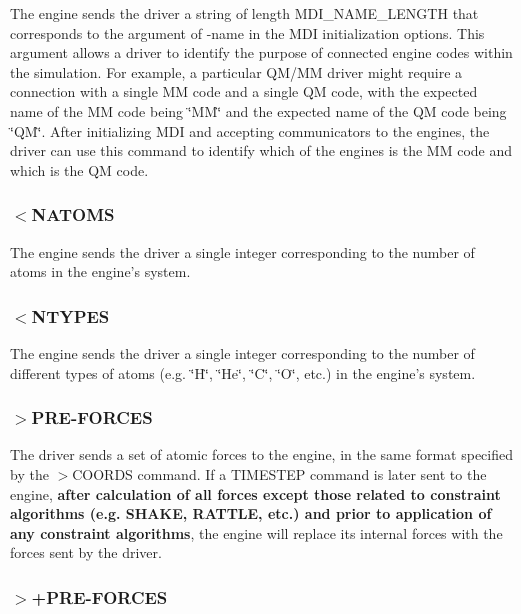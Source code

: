 The engine sends the driver a string of length {\ttfamily M\-D\-I\-\_\-\-N\-A\-M\-E\-\_\-\-L\-E\-N\-G\-T\-H} that corresponds to the argument of {\ttfamily -\/name} in the M\-D\-I initialization options. This argument allows a driver to identify the purpose of connected engine codes within the simulation. For example, a particular Q\-M/\-M\-M driver might require a connection with a single M\-M code and a single Q\-M code, with the expected name of the M\-M code being \char`\"{}\-M\-M\char`\"{} and the expected name of the Q\-M code being \char`\"{}\-Q\-M\char`\"{}. After initializing M\-D\-I and accepting communicators to the engines, the driver can use this command to identify which of the engines is the M\-M code and which is the Q\-M code.\hypertarget{index_recv_natoms}{}\subsubsection{$<$\-N\-A\-T\-O\-M\-S}\label{index_recv_natoms}
The engine sends the driver a single integer corresponding to the number of atoms in the engine's system.\hypertarget{index_recv_types}{}\subsubsection{$<$\-N\-T\-Y\-P\-E\-S}\label{index_recv_types}
The engine sends the driver a single integer corresponding to the number of different types of atoms (e.\-g. \char`\"{}\-H\char`\"{}, \char`\"{}\-He\char`\"{}, \char`\"{}\-C\char`\"{}, \char`\"{}\-O\char`\"{}, etc.) in the engine's system.\hypertarget{index_send_preforces}{}\subsubsection{$>$\-P\-R\-E-\/\-F\-O\-R\-C\-E\-S}\label{index_send_preforces}
The driver sends a set of atomic forces to the engine, in the same format specified by the {\ttfamily $>$C\-O\-O\-R\-D\-S} command. If a {\ttfamily T\-I\-M\-E\-S\-T\-E\-P} command is later sent to the engine, {\bfseries  after calculation of all forces except those related to constraint algorithms (e.\-g. S\-H\-A\-K\-E, R\-A\-T\-T\-L\-E, etc.) and prior to application of any constraint algorithms}, the engine will replace its internal forces with the forces sent by the driver.\hypertarget{index_send_add_preforces}{}\subsubsection{$>$+\-P\-R\-E-\/\-F\-O\-R\-C\-E\-S}\label{index_send_add_preforces}
